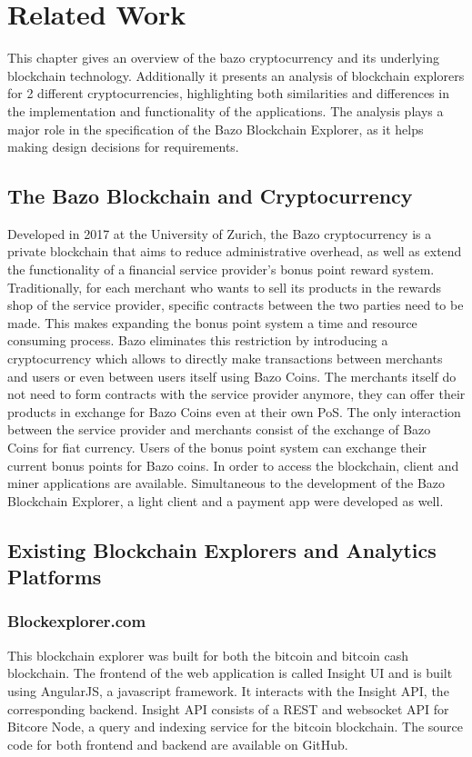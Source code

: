 \chapter{Related Work}
This chapter gives an overview of the bazo cryptocurrency and its underlying blockchain technology. Additionally it presents an analysis of blockchain explorers for 2 different cryptocurrencies, highlighting both similarities and differences in the implementation and functionality of the applications. The analysis plays a major role in the specification of the Bazo Blockchain Explorer, as it helps making design decisions for requirements.

\section{The Bazo Blockchain and Cryptocurrency}
Developed in 2017 at the University of Zurich, the Bazo cryptocurrency is a private blockchain that aims to reduce administrative overhead, as well as extend the functionality of a financial service provider's bonus point reward system. Traditionally, for each merchant who wants to sell its products in the rewards shop of the service provider, specific contracts between the two parties need to be made. This makes expanding the bonus point system a time and resource consuming process. Bazo eliminates this restriction by introducing a cryptocurrency which allows to directly make transactions between merchants and users or even between users itself using Bazo Coins. The merchants itself do not need to form contracts with the service provider anymore, they can offer their products in exchange for Bazo Coins even at their own PoS. The only interaction between the service provider and merchants consist of the exchange of Bazo Coins for fiat currency. Users of the bonus point system can exchange their current bonus points for Bazo coins. In order to access the blockchain, client and miner applications are available. Simultaneous to the development of the Bazo Blockchain Explorer, a light client and a payment app were developed as well.

\section{Existing Blockchain Explorers and Analytics Platforms}
\subsection{Blockexplorer.com}
This blockchain explorer was built for both the bitcoin and bitcoin cash blockchain. The frontend of the web application is called Insight UI and is built using AngularJS, a javascript framework. It interacts with the Insight API, the corresponding backend. Insight API consists of a REST and websocket API for Bitcore Node, a query and indexing service for the bitcoin blockchain. The source code for both frontend and backend are available on GitHub.

